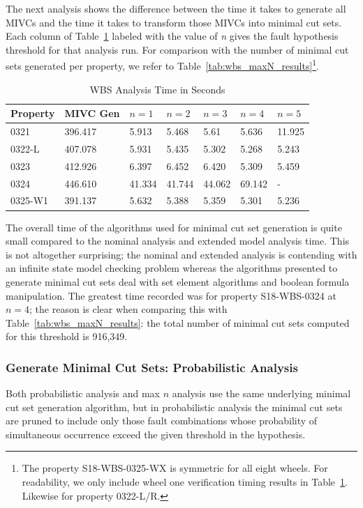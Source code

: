 The next analysis shows the difference between the time it takes to generate all MIVCs and the time it takes to transform those MIVCs into minimal cut sets. Each column of Table~\ref{tab:wbs_mincut} labeled with the value of \textit{n} gives the fault hypothesis threshold for that analysis run. For comparison with the number of minimal cut sets generated per property, we refer to Table~\ref{tab:wbs_maxN_results}\footnote{The property S18-WBS-0325-WX is symmetric for all eight wheels. For readability, we only include wheel one verification timing results in Table~\ref{tab:wbs_mincut}. Likewise for property 0322-L/R.}.
\begin{table}[htbp]
\begin{center}
    \begin{tabular}{ | l | l | l | l | l | l | l |}
    \hline
    \textbf{Property} &  MIVC Gen & $n=1$ & $n=2$ & $n=3$ & $n=4$ & $n=5$     \\ \hline \hline
    0321 & 396.417 & 5.913 & 5.468 & 5.61 & 5.636 & 11.925  \\ \hline
    0322-L  & 407.078 & 5.931 & 5.435 & 5.302 & 5.268 & 5.243 \\ \hline
    0323 & 412.926 & 6.397 & 6.452 & 6.420  & 5.309 & 5.459\\ \hline
    0324 & 446.610 & 41.334 & 41.744 & 44.062 & 69.142 & -\\ \hline
    0325-W1 & 391.137 & 5.632 & 5.388 &5.359 &5.301 & 5.236 \\ \hline
    \end{tabular}
    \caption{WBS Analysis Time in Seconds}
    \label{tab:wbs_mincut}
    \end{center}
\end{table}
The overall time of the algorithms used for minimal cut set generation is quite small compared to the nominal analysis and extended model analysis time. This is not altogether surprising; the nominal and extended analysis is contending with an infinite state model checking problem whereas the algorithms presented to generate minimal cut sets deal with set element algorithms and boolean formula manipulation. The greatest time recorded was for property S18-WBS-0324 at $n = 4$; the reason is clear when comparing this with Table~\ref{tab:wbs_maxN_results}: the total number of minimal cut sets computed for this threshold is 916,349.  

\subsubsection{Generate Minimal Cut Sets: Probabilistic Analysis}
\label{sec:prob_generate}
Both probabilistic analysis and max $n$ analysis use the same underlying minimal cut set generation algorithm, but in probabilistic analysis the minimal cut sets are pruned to include only those fault combinations whose probability of simultaneous occurrence exceed the given threshold in the hypothesis. 

